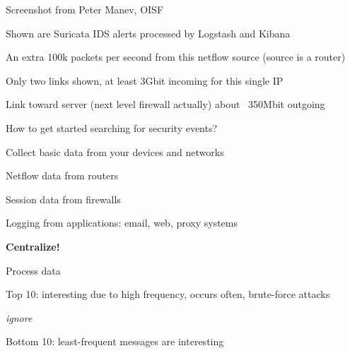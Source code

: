 \documentclass[Screen16to9,17pt]{foils}
\begin{document}





\vskip 2cm
\begin{list2}
\item Screenshot from Peter Manev, OISF
\item Shown are Suricata IDS alerts processed by Logstash and Kibana
\end{list2}









\centerline{An extra 100k packets per second from this netflow source (source is a router)}



\centerline{Only two links shown, at least 3Gbit incoming for this single IP}

\centerline{Link toward server (next level firewall actually) about ~350Mbit outgoing}



\begin{list1}
\item How to get started searching for security events?
\item Collect basic data from your devices and networks
\begin{list2}
\item Netflow data from routers
\item Session data from firewalls
\item Logging from applications: email, web, proxy systems
\end{list2}
\item {\bf Centralize!}
\item Process data
\begin{list2}
\item Top 10: interesting due to high frequency, occurs often, brute-force attacks
\item {\it ignore}
\item Bottom 10: least-frequent messages are interesting
\end{list2}
\end{list1}
\end{document}
